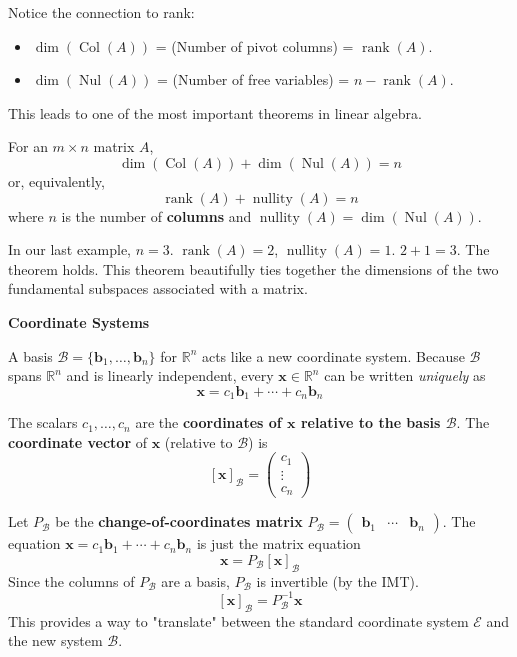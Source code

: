 Notice the connection to rank:
\begin{itemize}
    \item $\dim(\operatorname{Col}(A))$ = (Number of pivot columns) = $\operatorname{rank}(A)$.
    \item $\dim(\operatorname{Nul}(A))$ = (Number of free variables) = $n - \operatorname{rank}(A)$.
\end{itemize}
This leads to one of the most important theorems in linear algebra.

\begin{theorem}
For an $m \times n$ matrix $A$,
\[ \dim(\operatorname{Col}(A)) + \dim(\operatorname{Nul}(A)) = n \]
or, equivalently,
\[ \operatorname{rank}(A) + \operatorname{nullity}(A) = n \]
where $n$ is the number of \textbf{columns} and $\operatorname{nullity}(A) = \dim(\operatorname{Nul}(A))$.
\end{theorem}
In our last example, $n=3$. $\operatorname{rank}(A) = 2$, $\operatorname{nullity}(A) = 1$.
$2 + 1 = 3$. The theorem holds.
This theorem beautifully ties together the dimensions of the two fundamental subspaces associated with a matrix.

\textbf{Coordinate Systems}

A basis $\mathcal{B} = \{\mathbf{b}_1, \ldots, \mathbf{b}_n\}$ for $\mathbb{R}^n$ acts like a new coordinate system.
Because $\mathcal{B}$ spans $\mathbb{R}^n$ and is linearly independent, every $\mathbf{x} \in \mathbb{R}^n$ can be written \emph{uniquely} as
\[ \mathbf{x} = c_1\mathbf{b}_1 + \cdots + c_n\mathbf{b}_n \]
\begin{definition}
The scalars $c_1, \ldots, c_n$ are the \textbf{coordinates of $\mathbf{x}$ relative to the basis $\mathcal{B}$}.
The \textbf{coordinate vector} of $\mathbf{x}$ (relative to $\mathcal{B}$) is
\[ [\mathbf{x}]_{\mathcal{B}} = \begin{pmatrix} c_1 \\ \vdots \\ c_n \end{pmatrix} \]
\end{definition}

Let $P_{\mathcal{B}}$ be the \textbf{change-of-coordinates matrix} $P_{\mathcal{B}} = \begin{pmatrix} \mathbf{b}_1 & \cdots & \mathbf{b}_n \end{pmatrix}$.
The equation $\mathbf{x} = c_1\mathbf{b}_1 + \cdots + c_n\mathbf{b}_n$ is just the matrix equation
\[ \mathbf{x} = P_{\mathcal{B}} [\mathbf{x}]_{\mathcal{B}} \]
Since the columns of $P_{\mathcal{B}}$ are a basis, $P_{\mathcal{B}}$ is invertible (by the IMT).
\[ [\mathbf{x}]_{\mathcal{B}} = P_{\mathcal{B}}^{-1} \mathbf{x} \]
This provides a way to "translate" between the standard coordinate system $\mathcal{E}$ and the new system $\mathcal{B}$.

